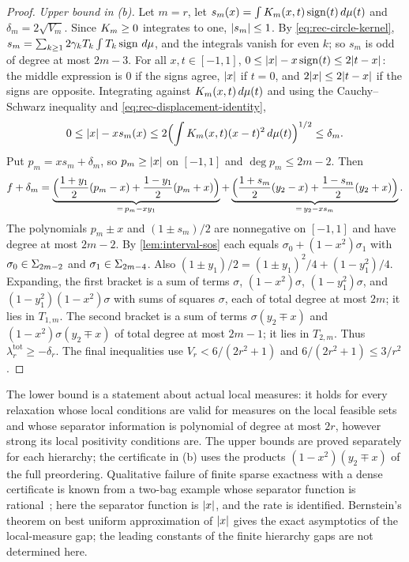 \begin{proof}
\emph{Upper bound in (b).} Let $m=r$, let $s_m(x)=\int K_m(x,t)\operatorname{sign}(t)\,
d\mu(t)$ and $\delta_m=2\sqrt{V_m}$. Since $K_m\ge0$ integrates to one,
$\lvert s_m\rvert\le1$. By \eqref{eq:rec-circle-kernel},
$s_m=\sum_{k\ge1}2\gamma_kT_k\int T_k\operatorname{sign}\,d\mu$, and the integrals
vanish for even $k$; so $s_m$ is odd of degree at most $2m-3$. For all
$x,t\in[-1,1]$, $0\le\lvert x\rvert-x\operatorname{sign}(t)\le2\lvert t-x\rvert$: the middle
expression is $0$ if the signs agree, $\lvert x\rvert$ if $t=0$, and $2\lvert x\rvert\le
2\lvert t-x\rvert$ if the signs are opposite. Integrating against
$K_m(x,t)\,d\mu(t)$ and using the Cauchy--Schwarz inequality and
\eqref{eq:rec-displacement-identity},
\[
  0\le\lvert x\rvert-xs_m(x)\le2\Bigl(\int K_m(x,t)(x-t)^2\,d\mu(t)\Bigr)^{1/2}
  \le\delta_m .
\]
Put $p_m=xs_m+\delta_m$, so $p_m\ge\lvert x\rvert$ on $[-1,1]$ and
$\deg p_m\le2m-2$. Then
\[
  f+\delta_m=\underbrace{\Bigl(\frac{1+y_1}2(p_m-x)+\frac{1-y_1}2(p_m+x)\Bigr)}_{=\,p_m-xy_1}
  +\underbrace{\Bigl(\frac{1+s_m}2(y_2-x)+\frac{1-s_m}2(y_2+x)\Bigr)}_{=\,y_2-xs_m}.
\]
The polynomials $p_m\pm x$ and $(1\pm s_m)/2$ are nonnegative on $[-1,1]$
and have degree at most $2m-2$. By \cref{lem:interval-sos} each equals
$\sigma_0+(1-x^2)\sigma_1$ with $\sigma_0\in\Sigma_{2m-2}$ and
$\sigma_1\in\Sigma_{2m-4}$. Also $(1\pm y_1)/2=(1\pm y_1)^2/4+(1-y_1^2)/4$.
Expanding, the first bracket is a sum of terms $\sigma$, $(1-x^2)\sigma$,
$(1-y_1^2)\sigma$, and $(1-y_1^2)(1-x^2)\sigma$ with sums of squares $\sigma$,
each of total degree at most $2m$; it lies in $T_{1,m}$. The second bracket
is a sum of terms $\sigma(y_2\mp x)$ and $(1-x^2)\sigma(y_2\mp x)$ of total
degree at most $2m-1$; it lies in $T_{2,m}$. Thus
$\lambda^{\mathrm{tot}}_r\ge-\delta_r$. The final inequalities use
$V_r<6/(2r^2+1)$ and $6/(2r^2+1)\le3/r^2$.
\end{proof}

The lower bound is a statement about actual local measures: it holds for
every relaxation whose local conditions are valid for measures on the local
feasible sets and whose separator information is polynomial of degree at
most $2r$, however strong its local positivity conditions are. The upper
bounds are proved separately for each hierarchy; the certificate in (b)
uses the products $(1-x^2)(y_2\mp x)$ of the full preordering. Qualitative
failure of finite sparse exactness with a dense certificate is known from a
two-bag example whose separator function is
rational~\cite{nie2026-sparse-tightness}; here the separator function is
$\lvert x\rvert$, and the rate is identified. Bernstein's theorem on best uniform
approximation of $\lvert x\rvert$ gives the exact asymptotics of the local-measure
gap; the leading constants of the finite hierarchy gaps are not determined
here.

